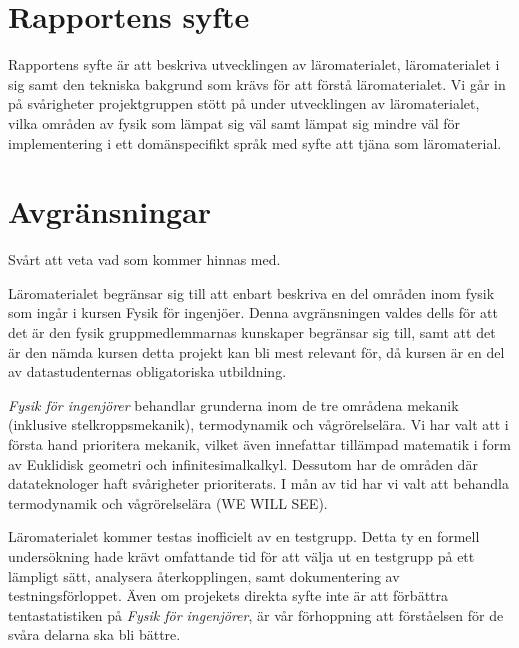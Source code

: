 \section{Rapportens syfte}

\begin{draft}
Rapportens syfte är att beskriva utvecklingen av läromaterialet, läromaterialet
i sig samt den tekniska bakgrund som krävs för att förstå läromaterialet. Vi går in på
svårigheter projektgruppen stött på under utvecklingen av läromaterialet, vilka områden
av fysik som lämpat sig väl samt lämpat sig mindre väl för implementering i ett 
domänspecifikt språk med syfte att tjäna som läromaterial.

\end{draft}


\section{Avgränsningar}

\begin{draft}

Svårt att veta vad som kommer hinnas med.

Läromaterialet begränsar sig till att enbart beskriva en del områden inom fysik som ingår i kursen Fysik för ingenjöer. Denna avgränsningen valdes dells för att det är den fysik gruppmedlemmarnas kunskaper begränsar sig till, samt att det är den nämda kursen detta projekt kan bli mest relevant för, då kursen är en del av datastudenternas obligatoriska utbildning.

\textit{Fysik för ingenjörer} behandlar grunderna inom de tre områdena mekanik (inklusive stelkroppsmekanik), termodynamik och vågrörelselära. Vi har valt att i första hand prioritera mekanik, vilket även innefattar tillämpad matematik i form av Euklidisk geometri och infinitesimalkalkyl. Dessutom har de områden där datateknologer haft svårigheter prioriterats. I mån av tid har vi valt att behandla termodynamik och vågrörelselära (WE WILL SEE). 

Läromaterialet kommer testas inofficielt av en testgrupp. Detta ty en formell undersökning hade krävt omfattande tid för att välja ut en testgrupp på ett lämpligt sätt, analysera återkopplingen, samt dokumentering av testningsförloppet. Även om projekets direkta syfte inte är att förbättra tentastatistiken på \textit{Fysik för ingenjörer}, är vår förhoppning att förståelsen för de svåra delarna ska bli bättre.
\end{draft}

